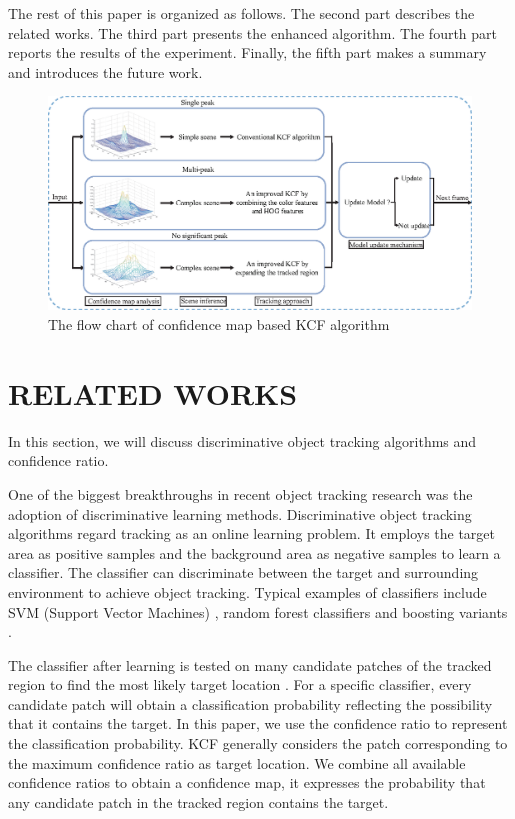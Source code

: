 \documentclass[conference]{IEEEtran}
\begin{document}
The rest of this paper is organized as follows. The second part describes the related works. The third part presents the enhanced algorithm. The fourth part reports the results of the experiment. Finally, the fifth part makes a summary and introduces the future work.
\begin{figure}[htbp]
	\centering
	\includegraphics[scale=1]{flow.eps}
	\caption{The flow chart of confidence map based KCF algorithm}
	\label{fig:flow}
\end{figure}

\section{RELATED WORKS}
In this section, we will discuss discriminative object tracking algorithms and confidence ratio.

One of the biggest breakthroughs in recent object tracking research was the adoption of discriminative learning methods. 
Discriminative object tracking algorithms regard tracking as an online learning problem.
It employs the target area as positive samples and the background area as negative samples to learn a classifier.
The classifier can discriminate between the target and surrounding environment to achieve object tracking.
Typical examples of classifiers include SVM (Support Vector Machines) \cite{SVM}, random forest classifiers \cite{Randomforest} and boosting variants \cite{Boosting}.

The classifier after learning is tested on many candidate patches of the tracked region to find the most likely target location \cite{confidencemap}. 
For a specific classifier, every candidate patch will obtain a classification probability reflecting the possibility that it contains the target. 
In this paper, we use the confidence ratio to represent the classification probability.
KCF generally considers the patch corresponding to the maximum confidence ratio as target location.
We combine all available confidence ratios to obtain a confidence map, it expresses the probability that any candidate patch in the tracked region contains the target.
\end{document}
